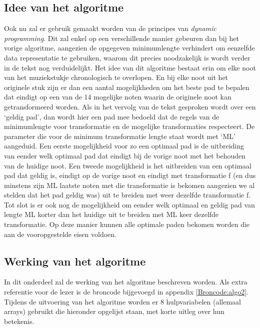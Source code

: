 \subsection{Idee van het algoritme}
Ook nu zal er gebruik gemaakt worden van de principes van \textit{dynamic programming}. Dit zal enkel op een verschillende manier gebeuren dan bij het vorige algoritme, aangezien de opgegeven minimumlengte verhindert om eenzelfde data representatie te gebruiken, waarom dit precies noodzakelijk is wordt verder in de tekst nog verduidelijkt. Het idee van dit algoritme bestaat erin om elke noot van het muziekstukje chronologisch te overlopen. En bij elke noot uit het originele stuk zijn er dan een aantal mogelijkheden om het beste pad te bepalen dat eindigt op een van de 14 mogelijke noten waarin de originele noot kan getransformeerd worden. Als in het vervolg van de tekst gesproken wordt over een `geldig pad', dan wordt hier een pad mee bedoeld dat de regels van de minimumlengte voor transformatie en de mogelijke transformaties respecteert. De parameter die voor de minimum transformatie lengte staat wordt met `ML' aangeduid. Een eerste mogelijkheid voor zo een optimaal pad is de uitbreiding van eender welk optimaal pad dat eindigt bij de vorige noot met het behouden van de huidige noot. Een tweede mogelijkheid is het uitbreiden van een optimaal pad dat geldig is, eindigt op de vorige noot en eindigt met transformatie f (en dus minstens zijn ML laatste noten met die transformatie is bekomen aangezien we al stelden dat het pad geldig was) uit te breiden met weer dezelfde transformatie f. Tot slot is er ook nog de mogelijkheid om eender welk optimaal en geldig pad van lengte ML korter dan het huidige uit te breiden met ML keer dezelfde transformatie. Op deze manier kunnen alle optimale paden bekomen worden die aan de vooropgestelde eisen voldoen.

\subsection{Werking van het algoritme}
In dit onderdeel zal de werking van het algoritme beschreven worden. Als extra referentie voor de lezer is de broncode bijgevoegd in appendix \ref{Broncode:algo2}.\\
Tijdens de uitvoering van het algoritme worden er 8 hulpvariabelen (allemaal arrays) gebruikt die hieronder opgelijst staan, met korte uitleg over hun betekenis.

